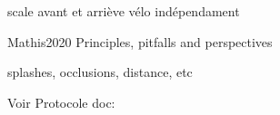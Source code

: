 scale avant et arriève vélo indépendament









Mathis2020 Principles, pitfalls and perspectives

splashes, occlusions, distance, etc

Voir Protocole doc: %

